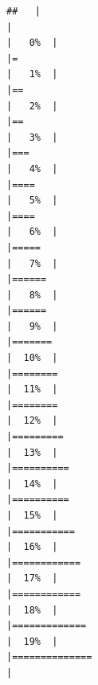 \documentclass[
]{article}
\begin{document}
\begin{verbatim}
##   |                                                                              |                                                                      |   0%  |                                                                              |=                                                                     |   1%  |                                                                              |==                                                                    |   2%  |                                                                              |==                                                                    |   3%  |                                                                              |===                                                                   |   4%  |                                                                              |====                                                                  |   5%  |                                                                              |====                                                                  |   6%  |                                                                              |=====                                                                 |   7%  |                                                                              |======                                                                |   8%  |                                                                              |======                                                                |   9%  |                                                                              |=======                                                               |  10%  |                                                                              |========                                                              |  11%  |                                                                              |========                                                              |  12%  |                                                                              |=========                                                             |  13%  |                                                                              |==========                                                            |  14%  |                                                                              |==========                                                            |  15%  |                                                                              |===========                                                           |  16%  |                                                                              |============                                                          |  17%  |                                                                              |============                                                          |  18%  |                                                                              |=============                                                         |  19%  |                                                                              |==============                                                        |  
\end{verbatim}
\end{document}
